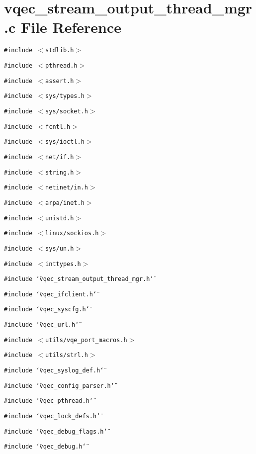 \section{vqec\_\-stream\_\-output\_\-thread\_\-mgr.c File Reference}
\label{vqec__stream__output__thread__mgr_8c}
{\tt \#include $<$stdlib.h$>$}\par
{\tt \#include $<$pthread.h$>$}\par
{\tt \#include $<$assert.h$>$}\par
{\tt \#include $<$sys/types.h$>$}\par
{\tt \#include $<$sys/socket.h$>$}\par
{\tt \#include $<$fcntl.h$>$}\par
{\tt \#include $<$sys/ioctl.h$>$}\par
{\tt \#include $<$net/if.h$>$}\par
{\tt \#include $<$string.h$>$}\par
{\tt \#include $<$netinet/in.h$>$}\par
{\tt \#include $<$arpa/inet.h$>$}\par
{\tt \#include $<$unistd.h$>$}\par
{\tt \#include $<$linux/sockios.h$>$}\par
{\tt \#include $<$sys/un.h$>$}\par
{\tt \#include $<$inttypes.h$>$}\par
{\tt \#include \char`\"{}vqec\_\-stream\_\-output\_\-thread\_\-mgr.h\char`\"{}}\par
{\tt \#include \char`\"{}vqec\_\-ifclient.h\char`\"{}}\par
{\tt \#include \char`\"{}vqec\_\-syscfg.h\char`\"{}}\par
{\tt \#include \char`\"{}vqec\_\-url.h\char`\"{}}\par
{\tt \#include $<$utils/vqe\_\-port\_\-macros.h$>$}\par
{\tt \#include $<$utils/strl.h$>$}\par
{\tt \#include \char`\"{}vqec\_\-syslog\_\-def.h\char`\"{}}\par
{\tt \#include \char`\"{}vqec\_\-config\_\-parser.h\char`\"{}}\par
{\tt \#include \char`\"{}vqec\_\-pthread.h\char`\"{}}\par
{\tt \#include \char`\"{}vqec\_\-lock\_\-defs.h\char`\"{}}\par
{\tt \#include \char`\"{}vqec\_\-debug\_\-flags.h\char`\"{}}\par
{\tt \#include \char`\"{}vqec\_\-debug.h\char`\"{}}\par
